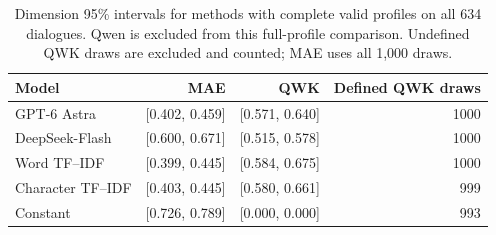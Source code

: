 \documentclass[11pt]{article}
\begin{document}
\begin{table}[t]
\centering\small
\setlength{\tabcolsep}{4pt}
\begin{tabular}{@{}lrrr@{}}
\toprule
Model & MAE & QWK & Defined QWK draws\\
\midrule
GPT-6 Astra & [0.402, 0.459] & [0.571, 0.640] & 1000\\
DeepSeek-Flash & [0.600, 0.671] & [0.515, 0.578] & 1000\\
Word TF--IDF & [0.399, 0.445] & [0.584, 0.675] & 1000\\
Character TF--IDF & [0.403, 0.445] & [0.580, 0.661] & 999\\
Constant & [0.726, 0.789] & [0.000, 0.000] & 993\\
\bottomrule
\end{tabular}
\caption{Dimension 95\% intervals for methods with complete valid profiles on all 634 dialogues. Qwen is excluded from this full-profile comparison. Undefined QWK draws are excluded and counted; MAE uses all 1,000 draws.}
\label{tab:dimension_full_ci}
\end{table}
\end{document}
